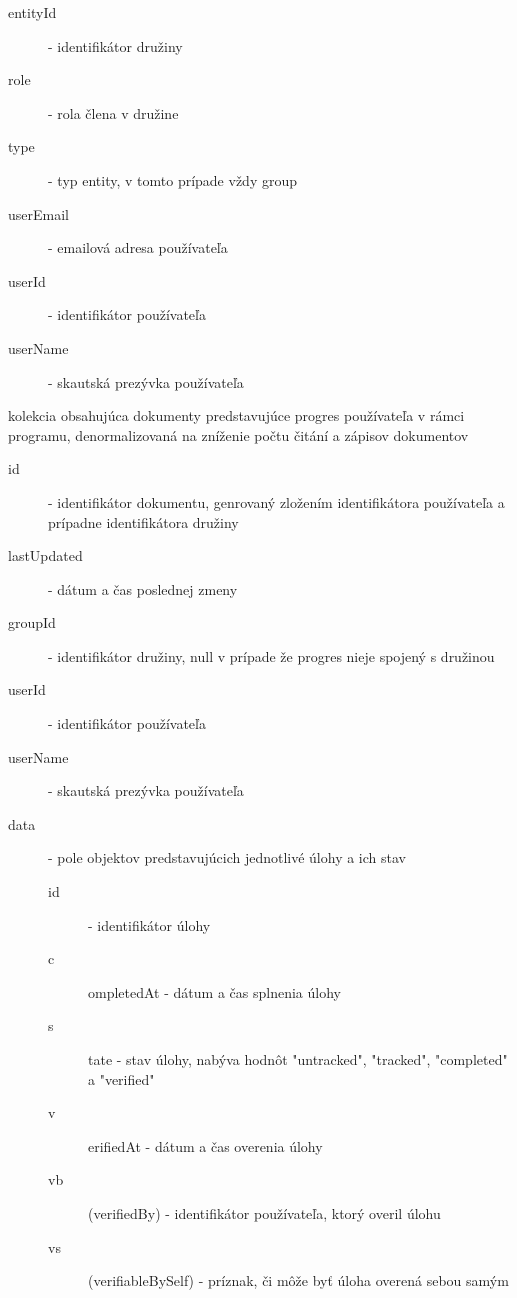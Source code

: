 \begin{description}
\begin{description}
            \item[entityId] - identifikátor družiny
            \item[role] - rola člena v družine
            \item[type] - typ entity, v tomto prípade vždy group
            \item[userEmail] - emailová adresa používateľa
            \item[userId] - identifikátor používateľa
            \item[userName] - skautská prezývka používateľa      
        \end{description}
    \item[userProgress] kolekcia obsahujúca dokumenty predstavujúce progres používateľa v rámci programu, denormalizovaná na zníženie počtu čitání a zápisov dokumentov
        \begin{description}
            \item[id] - identifikátor dokumentu, genrovaný zložením identifikátora používateľa a prípadne identifikátora družiny
            \item[lastUpdated] - dátum a čas poslednej zmeny
            \item[groupId] - identifikátor družiny, null v prípade že progres nieje spojený s družinou
            \item[userId] - identifikátor používateľa
            \item[userName] - skautská prezývka používateľa
            \item[data] - pole objektov predstavujúcich jednotlivé úlohy a ich stav
                \begin{description}
                    \item[id] - identifikátor úlohy
                    \item[c]ompletedAt - dátum a čas splnenia úlohy
                    \item[s]tate - stav úlohy, nabýva hodnôt "untracked", "tracked", "completed" a "verified"
                    \item[v]erifiedAt - dátum a čas overenia úlohy
                    \item[vb] (verifiedBy) - identifikátor používateľa, ktorý overil úlohu
                    \item[vs] (verifiableBySelf) - príznak, či môže byť úloha overená sebou samým
                \end{description}
        \end{description}
\end{description}

